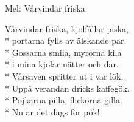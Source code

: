 \begin{SongText}[Pökvisa]
    \begin{SongInfo}
        Mel: Vårvindar friska
    \end{SongInfo}
    \begin{SongVerse}
        Vårvindar friska, kjolfållar piska,\\*%
        portarna fylls av älskande par.\\*%
        Gossarna smila, myrorna kila\\*%
        i mina kjolar nätter och dar.\\*%
        Vårsaven spritter ut i var lök.\\*%
        Uppå verandan dricks kaffegök.\\*%
        Pojkarna pilla, flickorna gilla.\\*%
        Nu är det dags för pök!
    \end{SongVerse}
\end{SongText}
